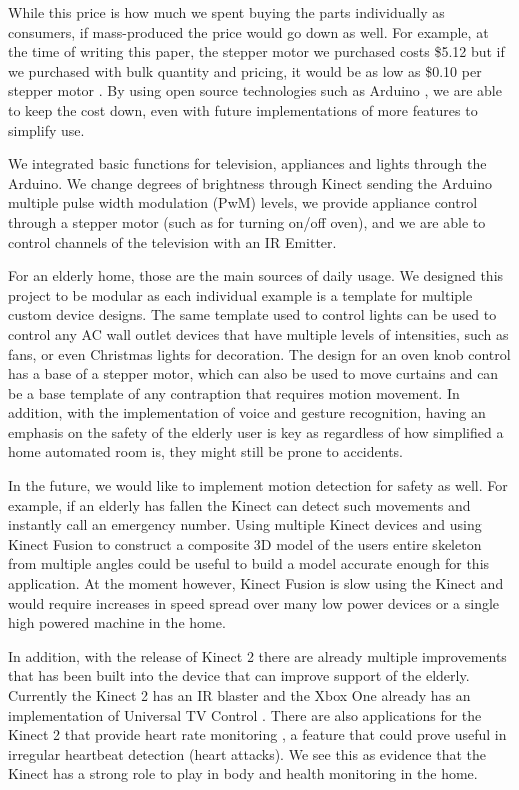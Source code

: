 \documentclass{chi-ext}
\begin{document}
While this price is how much we spent buying the parts individually as consumers, if mass-produced the price would go down as well.
For example, at the time of writing this paper, the stepper motor we purchased costs \$5.12 but if we purchased with bulk quantity and pricing, it would be as low as \$0.10 per stepper motor \cite{_stepper_motor}.
By using open source technologies such as Arduino \cite{_arduino_policy}, we are able to keep the cost down, even with future implementations of more features to simplify use.
 
We integrated basic functions for television, appliances and lights through the Arduino.
We change degrees of brightness through Kinect sending the Arduino multiple pulse width modulation (PwM) levels, we provide appliance control through a stepper motor (such as for turning on/off oven), and we are able to control channels of the television with an IR Emitter.

For an elderly home, those are the main sources of daily usage. We designed this project to be modular as each individual example is a template for multiple custom device designs.
The same template used to control lights can be used to control any AC wall outlet devices that have multiple levels of intensities, such as fans, or even Christmas lights for decoration.
The design for an oven knob control has a base of a stepper motor, which can also be used to move curtains and can be a base template of any contraption that requires motion movement.
In addition, with the implementation of voice and gesture recognition, having an emphasis on the safety of the elderly user is key as regardless of how simplified a home automated room is, they might still be prone to accidents. 

In the future, we would like to implement motion detection for safety as well.
For example, if an elderly has fallen the Kinect can detect such movements and instantly call an emergency number.
Using multiple Kinect devices and using Kinect Fusion \cite{_kinect_fusion} to construct a composite 3D model of the users entire skeleton from multiple angles could be useful to build a model accurate enough for this application.
At the moment however, Kinect Fusion is slow using the Kinect and would require increases in speed spread over many low power devices or a single high powered machine in the home. 

In addition, with the release of Kinect 2 there are already multiple improvements that has been built into the device that can improve support of the elderly.
Currently the Kinect 2 has an IR blaster and the Xbox One already has an implementation of Universal TV Control \cite{_control_tv}.
There are also applications for the Kinect 2 that provide heart rate monitoring \cite{_xbox_fitness}, a feature that could prove useful in irregular heartbeat detection (heart attacks).
We see this as evidence that the Kinect has a strong role to play in body and health monitoring in the home.
\end{document}
